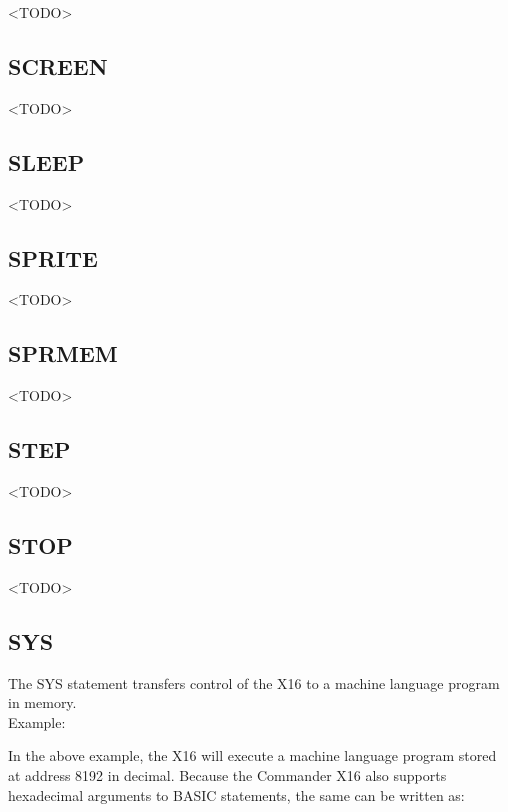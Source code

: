 <TODO>

\subsection{SCREEN}

<TODO>

\subsection{SLEEP}

<TODO>

\subsection{SPRITE}

<TODO>

\subsection{SPRMEM}

<TODO>

\subsection{STEP}

<TODO>

\subsection{STOP}

<TODO>

\subsection{SYS}

The {\ttfamily SYS} statement transfers control of the X16 to a machine
language program in memory.\\

Example:\\


In the above example, the X16 will execute a machine language program stored at
address 8192 in decimal.  Because the Commander X16 also supports hexadecimal
arguments to BASIC statements, the same can be written as:\\


